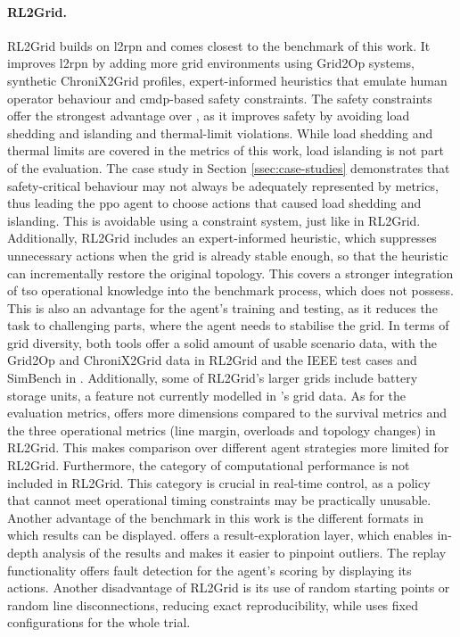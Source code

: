 \paragraph{RL2Grid.}
RL2Grid builds on \ac{l2rpn} and comes closest to the benchmark of this work. It improves \ac{l2rpn} by adding more grid environments using Grid2Op systems, synthetic ChroniX2Grid profiles, expert-informed heuristics that emulate human operator behaviour and \ac{cmdp}-based safety constraints. The safety constraints offer the strongest advantage over \benchmark, as it improves safety by avoiding load shedding and islanding and thermal-limit violations. While load shedding and thermal limits are covered in the metrics of this work, load islanding is not part of the evaluation. The case study in Section \ref{ssec:case-studies} demonstrates that safety-critical behaviour may not always be adequately represented by metrics, thus leading the \ac{ppo} agent to choose actions that caused load shedding and islanding. This is avoidable using a constraint system, just like in RL2Grid. Additionally, RL2Grid includes an expert-informed heuristic, which suppresses unnecessary actions when the grid is already stable enough, so that the heuristic can incrementally restore the original topology. This covers a stronger integration of \ac{tso} operational knowledge into the benchmark process, which \benchmark does not possess. This is also an advantage for the agent's training and testing, as it reduces the task to challenging parts, where the agent needs to stabilise the grid. In terms of grid diversity, both tools offer a solid amount of usable scenario data, with the Grid2Op and ChroniX2Grid data in RL2Grid and the IEEE test cases and SimBench in \benchmark. Additionally, some of RL2Grid's larger grids include battery storage units, a feature not currently modelled in \benchmark's grid data.
As for the evaluation metrics, \benchmark offers more dimensions compared to the survival metrics and the three operational metrics (line margin, overloads and topology changes) in RL2Grid. This makes comparison over different agent strategies more limited for RL2Grid. Furthermore, the category of computational performance is not included in RL2Grid. This category is crucial in real-time control, as a policy that cannot meet operational timing constraints may be practically unusable. Another advantage of the benchmark in this work is the different formats in which results can be displayed. \benchmark offers a result-exploration layer, which enables in-depth analysis of the results and makes it easier to pinpoint outliers. The replay functionality offers fault detection for the agent's scoring by displaying its actions. Another disadvantage of RL2Grid is its use of random starting points or random line disconnections, reducing exact reproducibility, while \benchmark uses fixed configurations for the whole trial.





